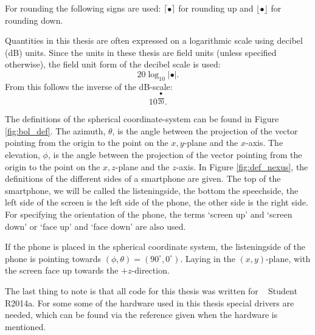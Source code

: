 For rounding the following signs are used:
$\lceil\bullet\rceil$
for rounding up and
$\lfloor\bullet\rfloor$
for rounding down.

Quantities in this thesis are often expressed on a logarithmic scale using decibel (dB) units.
Since the units in these thesis are field units (unless specified otherwise), the field unit form of the decibel scale is used:
\begin{equation*}
20\log_{10}|\bullet|.
\end{equation*}
From this follows the inverse of the dB-scale:
\begin{equation*}
10^{\dfrac{\bullet}{20}}.
\end{equation*}

The definitions of the spherical coordinate-system can be found in Figure \ref{fig:bol_def}.
The azimuth, $\theta$, is the angle between the projection of the vector pointing from the origin to the point on the $x,y$-plane and the $x$-axis.
The elevation, $\phi$, is the angle between the projection of the vector pointing from the origin to the point on the $x,z$-plane and the $z$-axis.
In Figure \ref{fig:def_nexus}, the definitions of the different sides of a smartphone are given.
The top of the smartphone, we will be called the listeningside, the bottom the speechside, the left side of the screen is the left side of the phone, the other side is the right side.
For specifying the orientation of the phone, the terms `screen up' and `screen down'  or `face up' and `face down' are also used.

If the phone is placed in the spherical coordinate system, the listeningside of the phone is pointing towards $(\phi,\theta)=(90^\circ,0^\circ)$.
Laying in the $(x,y)$-plane, with the screen face up towards the $+z$-direction.

The last thing to note is that all code for this thesis was written for \matlab~ Student R2014a. For some some of the hardware used in this thesis special drivers are needed, which can be found via the reference given when the hardware is mentioned.

\vspace{1in}

